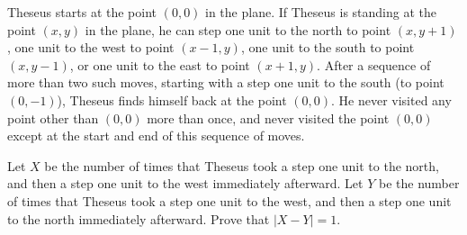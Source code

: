 Theseus starts at the point $(0, 0)$ in the plane. If Theseus is standing at the point $(x, y)$ in the plane, he can step one unit to the north to point $(x, y+1)$,  one unit to the west to point $(x-1, y)$,  one unit to the south to point $(x, y-1)$,  or one unit to the east to point $(x+1, y)$. After a sequence of more than two such moves, starting with a step one unit to the south (to point $(0, -1)$), Theseus finds himself back at the point $(0, 0)$. He never visited any point other than $(0, 0)$ more than once, and never visited the point $(0, 0)$ except at the start and end of this sequence of moves.

Let $X$
 be the number of times that Theseus took a step one unit to the north, 
and then a step one unit to the west immediately afterward. Let $Y$
 be the number of times that Theseus took a step one unit to the west, 
and then a step one unit to the north immediately afterward. Prove that $|X - Y| = 1$.
